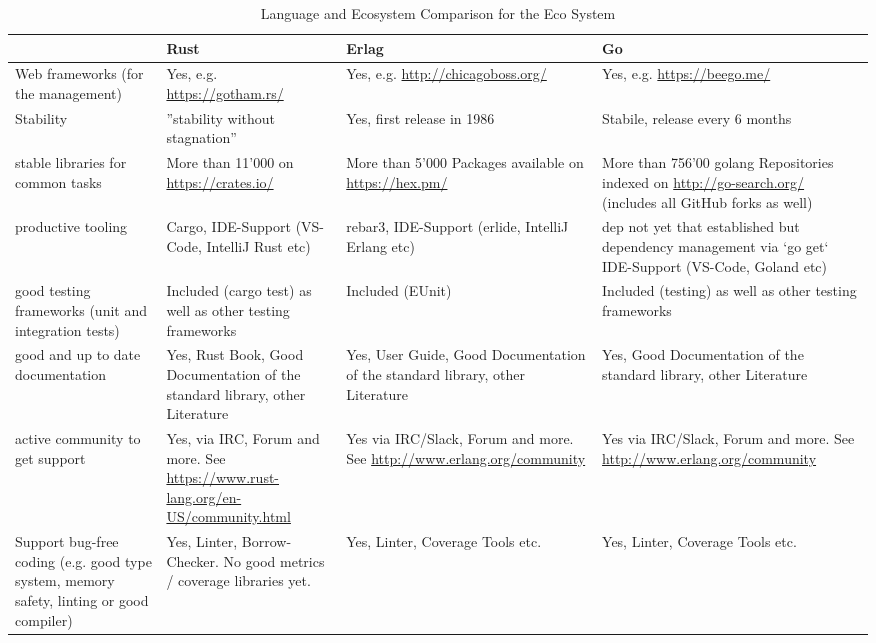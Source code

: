 \begin{sidewaystable}
	\centering
	\caption{Language and Ecosystem Comparison for the Eco System}
	\label{language-comparison-eco-system}
	\begin{tabu}{X|X X X}
		\hline
		& Rust
		& Erlag
		& Go
		\\ \hline

		Web frameworks (for the management)
		& Yes, e.g. \url{https://gotham.rs/}
		& Yes, e.g. \url{http://chicagoboss.org/}
		& Yes, e.g. \url{https://beego.me/}
		\\
		
		Stability
		& ''stability without stagnation'' \cite{rust-blog-stability}
		& Yes, first release in 1986 \cite{erlang-org}
		& Stabile, release every 6 months \cite{go-github-release-cycle}
		\\
		
		stable libraries for common tasks
		& More than 11'000 on \url{https://crates.io/}
		& More than 5'000 Packages available on \url{https://hex.pm/}
		& More than 756'00 golang Repositories indexed on \url{http://go-search.org/} (includes all GitHub forks as well)
		\\
		
		productive tooling
		& Cargo, IDE-Support (VS-Code, IntelliJ Rust etc)
		& rebar3, IDE-Support (erlide, IntelliJ Erlang etc)
		& dep not yet that established but dependency management via `go get` IDE-Support (VS-Code, Goland etc)
		\\
		
		good testing frameworks (unit and integration tests)
		& Included (cargo test) as well as other testing frameworks
		& Included (EUnit)
		& Included (testing) as well as other testing frameworks
		\\
		
		good and up to date documentation
		& Yes, Rust Book, Good Documentation of the standard library, other Literature
		& Yes, User Guide, Good Documentation of the standard library, other Literature
		& Yes, Good Documentation of the standard library, other Literature
		\\
		
		active community to get support
		& Yes, via IRC, Forum and more. See \url{https://www.rust-lang.org/en-US/community.html}
		& Yes via IRC/Slack, Forum and more. See \url{http://www.erlang.org/community}
		& Yes via IRC/Slack, Forum and more. See \url{http://www.erlang.org/community}
		\\
		
		Support bug-free coding (e.g. good type system, memory safety, linting or good compiler)
		& Yes, Linter, Borrow-Checker. No good metrics / coverage libraries yet.
		& Yes, Linter, Coverage Tools etc.
		& Yes, Linter, Coverage Tools etc.
	\end{tabu}
\end{sidewaystable}

